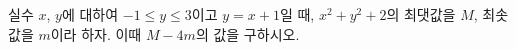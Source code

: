 실수 $x$, $y$에 대하여 $-1\le y\le 3$이고 $y=x+1$일 때, $x^2+y^2+2$의 최댓값을 $M$, 최솟값을 $m$이라 하자. 이때 $M-4m$의 값을 구하시오.
